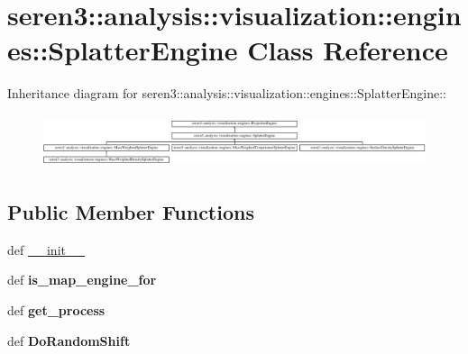 \hypertarget{classseren3_1_1analysis_1_1visualization_1_1engines_1_1SplatterEngine}{
\section{seren3::analysis::visualization::engines::SplatterEngine Class Reference}
\label{classseren3_1_1analysis_1_1visualization_1_1engines_1_1SplatterEngine}
}
Inheritance diagram for seren3::analysis::visualization::engines::SplatterEngine::\begin{figure}[H]
\begin{center}
\leavevmode
\includegraphics[height=1.56534cm]{classseren3_1_1analysis_1_1visualization_1_1engines_1_1SplatterEngine}
\end{center}
\end{figure}
\subsection*{Public Member Functions}
\begin{DoxyCompactItemize}
\item 
def \hyperlink{classseren3_1_1analysis_1_1visualization_1_1engines_1_1SplatterEngine_acb5713fdebb0354f14b8d3e1d00fc05b}{\_\-\_\-init\_\-\_\-}
\item 
\hypertarget{classseren3_1_1analysis_1_1visualization_1_1engines_1_1SplatterEngine_a9f2650b0134d07588118d6d4fb6549b6}{
def {\bfseries is\_\-map\_\-engine\_\-for}}
\label{classseren3_1_1analysis_1_1visualization_1_1engines_1_1SplatterEngine_a9f2650b0134d07588118d6d4fb6549b6}

\item 
\hypertarget{classseren3_1_1analysis_1_1visualization_1_1engines_1_1SplatterEngine_a75089b51a31ac75dfe704828eacba320}{
def {\bfseries get\_\-process}}
\label{classseren3_1_1analysis_1_1visualization_1_1engines_1_1SplatterEngine_a75089b51a31ac75dfe704828eacba320}

\item 
\hypertarget{classseren3_1_1analysis_1_1visualization_1_1engines_1_1SplatterEngine_aac76f2029f013e5556f92d2d072e2860}{
def {\bfseries DoRandomShift}}
\label{classseren3_1_1analysis_1_1visualization_1_1engines_1_1SplatterEngine_aac76f2029f013e5556f92d2d072e2860}

\end{DoxyCompactItemize}


